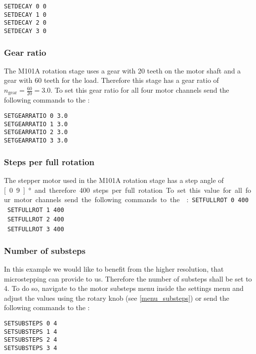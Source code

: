 \texttt{SETDECAY 0 0}\\
\texttt{SETDECAY 1 0}\\
\texttt{SETDECAY 2 0}\\
\texttt{SETDECAY 3 0}

\subsubsection{Gear ratio}
The M101A rotation stage uses a gear with 20 teeth on the motor shaft and a gear with 60 teeth for the load. Therefore this stage has a gear ratio of $n_{\textrm{gear}} = \frac{60}{20} = 3.0$. To set this gear ratio for all four motor channels send the following commands to the \productName :

\texttt{SETGEARRATIO 0 3.0}\\
\texttt{SETGEARRATIO 1 3.0}\\
\texttt{SETGEARRATIO 2 3.0}\\
\texttt{SETGEARRATIO 3 3.0}

\subsubsection{Steps per full rotation}
The stepper motor used in the M101A rotation stage has a step angle of \unit[0.9]{°} and therefore 400 steps per full rotation. To set this value for all four motor channels send the following commands to the \productName :

\texttt{SETFULLROT 0 400}\\
\texttt{SETFULLROT 1 400}\\
\texttt{SETFULLROT 2 400}\\
\texttt{SETFULLROT 3 400}

\subsubsection{Number of substeps}
In this example we would like to benefit from the higher resolution, that microstepping can provide to us. Therefore the number of substeps shall be set to 4. To do so, navigate to the motor substeps menu inside the settings menu and adjust the values using the rotary knob (see \ref{menu_substeps}) or send the following commands to the \productName :

\texttt{SETSUBSTEPS 0 4}\\
\texttt{SETSUBSTEPS 1 4}\\
\texttt{SETSUBSTEPS 2 4}\\
\texttt{SETSUBSTEPS 3 4}

